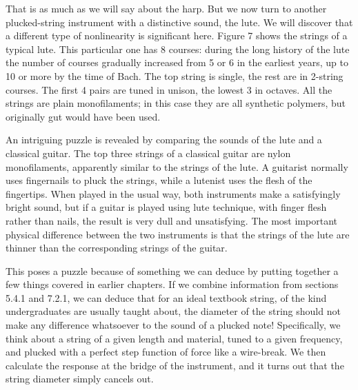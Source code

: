 \audio{}

\audio{}

\audio{}

\audio{}

\audio{}

\audio{}

  That is as much as we will say about the harp. But we now turn to another 
  plucked-string instrument with a distinctive sound, the lute. We will 
  discover that a different type of nonlinearity is significant here. Figure 7 
  shows the strings of a typical lute. This particular one has 8 courses: 
  during the long history of the lute the number of courses gradually increased 
  from 5 or 6 in the earliest years, up to 10 or more by the time of Bach. The 
  top string is single, the rest are in 2-string courses. The first 4 pairs are 
  tuned in unison, the lowest 3 in octaves. All the strings are plain 
  monofilaments; in this case they are all synthetic polymers, but originally 
  gut would have been used. 


  An intriguing puzzle is revealed by comparing the sounds of the lute and a 
  classical guitar. The top three strings of a classical guitar are nylon 
  monofilaments, apparently similar to the strings of the lute. A guitarist 
  normally uses fingernails to pluck the strings, while a lutenist uses the 
  flesh of the fingertips. When played in the usual way, both instruments make 
  a satisfyingly bright sound, but if a guitar is played using lute technique, 
  with finger flesh rather than nails, the result is very dull and 
  unsatisfying. The most important physical difference between the two 
  instruments is that the strings of the lute are thinner than the 
  corresponding strings of the guitar. 

  This poses a puzzle because of something we can deduce by putting together a 
  few things covered in earlier chapters. If we combine information from 
  sections 5.4.1 and 7.2.1, we can deduce that for an ideal textbook string, of 
  the kind undergraduates are usually taught about, the diameter of the string 
  should not make any difference whatsoever to the sound of a plucked note! 
  Specifically, we think about a string of a given length and material, tuned 
  to a given frequency, and plucked with a perfect step function of force like 
  a wire-break. We then calculate the response at the bridge of the instrument, 
  and it turns out that the string diameter simply cancels out. 

